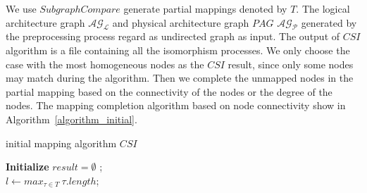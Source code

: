 \documentclass[runningheads]{llncs}
\begin{document}
We use $SubgraphCompare$ generate partial mappings denoted by $T$. The logical architecture graph  $\mathcal{AG_{L}}$ 
and physical architecture graph $PAG$ $\mathcal{AG_{P}}$ generated by the preprocessing process regard as undirected graph as input. The output of $CSI$ algorithm is a file containing all the isomorphism processes. We only choose the case with the most homogeneous nodes as the $CSI$ result, since only some nodes may match during the algorithm. Then we complete the unmapped nodes in the partial mapping based on the connectivity of the nodes or the degree of the nodes. The mapping completion algorithm based on node connectivity show in Algorithm~\ref{algorithm_initial}.
\begin{algorithm}  
	\label{algorithm_initial}
	\caption{initial mapping algorithm $CSI$}  
	\LinesNumbered  
	\textbf{Initialize} $result=\emptyset$ ;\\
	$l \leftarrow max_{\tau \in T} \  \tau.length$; \\
	\end{algorithm}
	
\end{document}
